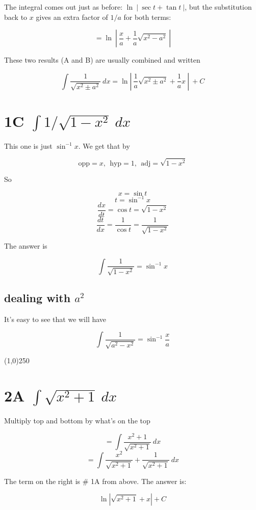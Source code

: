 \documentclass[11pt, oneside]{article}
\begin{document}
The integral comes out just as before:   $\ln \ | \ \sec t + \tan t \ |$, but the substitution back to $x$ gives an extra factor of $1/a$ for both terms:

\[ = \ln \ | \ \frac{x}{a} + \frac{1}{a} \sqrt{x^2 - a^2}  \ | \]

These two results (A and B) are usually combined and written

\[ \int \frac{1}{ \sqrt{x^2 \pm a^2}} \ dx = \ln | \ \frac{1}{a} \sqrt{x^2 \pm a^2}  + \frac{1}{a} x \ | \ + C \]

\section*{1C $\int 1/\sqrt{1 - x^2} \ dx$}

This one is just $\sin^{-1} x$.  We get that by

\[ \text{opp} = x, \ \ \text{hyp} = 1, \ \ \text{adj} = \sqrt{1 - x^2}   \]

So 

\[ x = \sin t \]
\[ t = \sin^{-1} x \]
\[ \frac{dx}{dt} = \cos t = \sqrt{1-x^2}\]
\[ \frac{dt}{dx} = \frac{1}{\cos t} = \frac{1}{\sqrt{1-x^2}} \]

The answer is

\[ \int \frac{1}{\sqrt{1 - x^2}} = \sin^{-1} x \]

\subsection*{dealing with $a^2$}

It's easy to see that we will have

\[ \int \frac{1}{\sqrt{a^2 - x^2}} = \sin^{-1} \frac{x}{a} \]

\begin{center} \line(1,0){250} \end{center}

\section*{2A $\int \sqrt{x^2 + 1} \ dx$}

Multiply top and bottom by what's on the top

\[ = \int \frac{x^2 + 1}{\sqrt{x^2 + 1}} \ dx \]
\[ =  \int \frac{x^2}{\sqrt{x^2 + 1}} + \frac{1}{\sqrt{x^2 + 1}} \ dx \]

The term on the right is \# 1A from above.  The answer is:

\[  \ln |\sqrt{x^2+1} + x| + C \]
\end{document}
